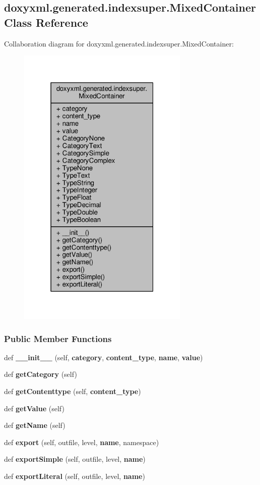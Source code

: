 \subsection{doxyxml.\+generated.\+indexsuper.\+Mixed\+Container Class Reference}
\label{classdoxyxml_1_1generated_1_1indexsuper_1_1MixedContainer}


Collaboration diagram for doxyxml.\+generated.\+indexsuper.\+Mixed\+Container\+:
\nopagebreak
\begin{figure}[H]
\begin{center}
\leavevmode
\includegraphics[width=232pt]{d2/d3e/classdoxyxml_1_1generated_1_1indexsuper_1_1MixedContainer__coll__graph}
\end{center}
\end{figure}
\subsubsection*{Public Member Functions}
\begin{DoxyCompactItemize}
\item 
def {\bf \+\_\+\+\_\+init\+\_\+\+\_\+} (self, {\bf category}, {\bf content\+\_\+type}, {\bf name}, {\bf value})
\item 
def {\bf get\+Category} (self)
\item 
def {\bf get\+Contenttype} (self, {\bf content\+\_\+type})
\item 
def {\bf get\+Value} (self)
\item 
def {\bf get\+Name} (self)
\item 
def {\bf export} (self, outfile, level, {\bf name}, namespace)
\item 
def {\bf export\+Simple} (self, outfile, level, {\bf name})
\item 
def {\bf export\+Literal} (self, outfile, level, {\bf name})
\end{DoxyCompactItemize}
